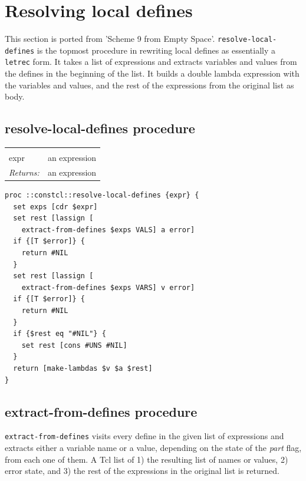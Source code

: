 \documentclass[twoside]{report}
\begin{document}
\section{Resolving local defines}
\label{resolving-local-defines}

This section is ported from 'Scheme 9 from Empty Space'. \texttt{resolve-local-defines} is the topmost procedure in rewriting local defines as essentially a \texttt{letrec} form. It takes a list of expressions and extracts variables and values from the defines in the beginning of the list. It builds a double lambda expression with the variables and values, and the rest of the expressions from the original list as body.

\subsection{resolve-local-defines procedure}
\label{resolvelocaldefines-procedure}

\noindent\begin{tabular}{ |p{1.9cm} p{8cm}| }
\hline
\rowcolor[HTML]{CCCCCC} \multicolumn{2}{|l|}{\bf resolve-local-defines} \\
expr & an expression \\
\textit{Returns:} & an expression \\
\hline
\end{tabular}

\begin{lstlisting}
proc ::constcl::resolve-local-defines {expr} {
  set exps [cdr $expr]
  set rest [lassign [
    extract-from-defines $exps VALS] a error]
  if {[T $error]} {
    return #NIL
  }
  set rest [lassign [
    extract-from-defines $exps VARS] v error]
  if {[T $error]} {
    return #NIL
  }
  if {$rest eq "#NIL"} {
    set rest [cons #UNS #NIL]
  }
  return [make-lambdas $v $a $rest]
}
\end{lstlisting}

\subsection{extract-from-defines procedure}
\label{extractfromdefines-procedure}

\texttt{extract-from-defines} visits every define in the given list of expressions and extracts either a variable name or a value, depending on the state of the \emph{part} flag, from each one of them. A Tcl list of 1) the resulting list of names or values, 2) error state, and 3) the rest of the expressions in the original list is returned.
\end{document}
